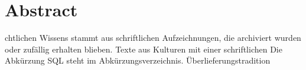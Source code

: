 \newpage
\section*{Abstract}
chtlichen Wissens stammt aus schriftlichen Aufzeichnungen, die archiviert wurden oder zufällig erhalten blieben. Texte aus Kulturen mit einer schriftlichen Die Abkürzung SQL   steht im Abkürzungsverzeichnis.  Überlieferungstradition   


\newpage